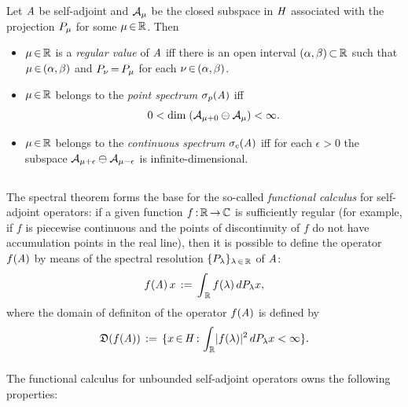\documentclass[11pt,twoside]{article}
\begin{document}
\begin{theorem}\label{SPECTRUM_RESOLUTION_THEOREM}
Let $\mathit{A}$ be self-adjoint
and $\mathcal{A}_{\mu}$ be the closed subspace in $\mathit{H}$
associated with the projection ${P}_{\mu}$ for some $\mu {\,\in\,} {\mathbb{R}}$.
Then

\begin{itemize}[leftmargin=9mm]
\item[1.]
$\mu {\,\in\,} {\mathbb{R}}$ is a \textit{regular value} of $\mathit{A}$
iff
there is an open interval $(\alpha,\beta) {\,\subset\,} {\mathbb{R}}$
such that $\mu {\,\in\,} (\alpha,\beta)$
and ${P}_{\nu} {\,=\,} {P}_{\mu}$ for each $\nu {\,\in\,} (\alpha,\beta)$.

\item[2.]
$\mu {\,\in\,} {\mathbb{R}}$ belongs to the \textit{point spectrum} $\sigma_p(\mathit{A})$
iff
\[
0 < \operatorname{dim} \; (\mathcal{A}_{\mu+0} \ominus \mathcal{A}_{\mu}) < \infty.
\]

\item[3.]
$\mu {\,\in\,} {\mathbb{R}}$ belongs to the \textit{continuous spectrum} $\sigma_c(\mathit{A})$
iff
for each $\epsilon > 0$ the subspace
$\mathcal{A}_{\mu+\epsilon} \ominus \mathcal{A}_{\mu-\epsilon}$ is infinite-dimensional.
\end{itemize}
\end{theorem}

\subsection{} %
The spectral theorem forms the base
for the so-called \textit{functional calculus} for self-adjoint operators:
if a given function $f {\,:\,} {\mathbb{R}} {\,\to\,} {\mathbb{C}}$ is sufficiently regular
(for example,
if $f$ is piecewise continuous and the points of discontinuity of $f$
do not have accumulation points in the real line),
then it is possible to define the operator $f(\mathit{A})$
by means of the spectral resolution
$\{{P}_{\lambda}\}_{\lambda {\,\in\,} {\mathbb{R}}}$ of $\mathit{A}$:
\[
f(\mathit{A}) \, x \,:=\, \int_{\,{\mathbb{R}}} f(\lambda) \, d{P}_{\lambda}x,
\]
where the domain of definiton of the operator $f(\mathit{A})$ is defined by
\[
\domain{f(\linA)} \eqdef
\{x \xeof \hilH \:
\int_{\R} \abs{f(\lambda)} ^2 \, d\linP_{\lambda}x < \infty \}.
\]

\subparagraph{} %
The functional calculus for unbounded self-adjoint operators owns
the following properties:
\end{document}
